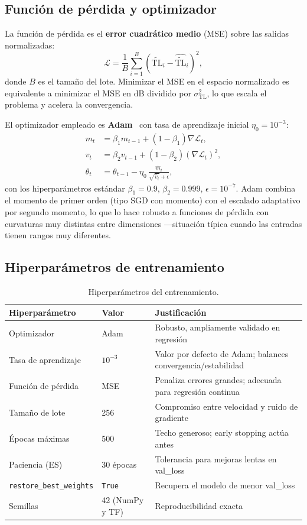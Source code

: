 \documentclass[12pt,a4paper]{article}
\newcommand{\TL}{\mathrm{TL}}
\newcommand{\TLnorm}{\widetilde{\TL}}
\begin{document}
\subsection{Función de pérdida y optimizador}

La función de pérdida es el \textbf{error cuadrático medio} (MSE) sobre las
salidas normalizadas:
\begin{equation}
  \mathcal{L} = \frac{1}{B}\sum_{i=1}^{B}
                \left(\TLnorm_i - \hat{\TLnorm}_i\right)^2,
  \label{eq:loss}
\end{equation}
donde $B$ es el tamaño del lote. Minimizar el MSE en el espacio normalizado
es equivalente a minimizar el MSE en dB dividido por $\sigma_{\TL}^2$, lo que
escala el problema y acelera la convergencia.

El optimizador empleado es \textbf{Adam}~\cite{kingma2015} con tasa de
aprendizaje inicial $\eta_0 = 10^{-3}$:
\begin{align}
  m_t &= \beta_1 m_{t-1} + (1-\beta_1)\nabla\mathcal{L}_t, \\
  v_t &= \beta_2 v_{t-1} + (1-\beta_2)(\nabla\mathcal{L}_t)^2, \\
  \theta_t &= \theta_{t-1} - \eta_0\,\frac{\hat{m}_t}{\sqrt{\hat{v}_t}+\epsilon},
\end{align}
con los hiperparámetros estándar $\beta_1=0.9$, $\beta_2=0.999$,
$\epsilon=10^{-7}$. Adam combina el momento de primer orden (tipo SGD con
momento) con el escalado adaptativo por segundo momento, lo que lo hace
robusto a funciones de pérdida con curvaturas muy distintas entre dimensiones
—situación típica cuando las entradas tienen rangos muy diferentes.

\subsection{Hiperparámetros de entrenamiento}

\begin{table}[H]
\centering
\caption{Hiperparámetros del entrenamiento.}
\label{tab:hiperparametros}
\begin{tabular}{lll}
\toprule
Hiperparámetro & Valor & Justificación \\
\midrule
Optimizador     & Adam & Robusto, ampliamente validado en regresión \\
Tasa de aprendizaje & $10^{-3}$ & Valor por defecto de Adam; balances convergencia/estabilidad \\
Función de pérdida & MSE & Penaliza errores grandes; adecuada para regresión continua \\
Tamaño de lote  & 256 & Compromiso entre velocidad y ruido de gradiente \\
Épocas máximas  & 500 & Techo generoso; early stopping actúa antes \\
Paciencia (ES)  & 30 épocas & Tolerancia para mejoras lentas en val\_loss \\
\texttt{restore\_best\_weights} & \texttt{True} & Recupera el modelo de menor val\_loss \\
Semillas        & 42 (NumPy y TF) & Reproducibilidad exacta \\
\bottomrule
\end{tabular}
\end{table}
\end{document}
